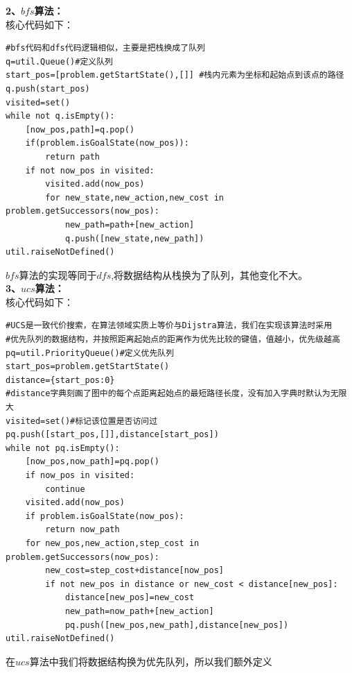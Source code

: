 \documentclass[a4paper,12pt,UTF8]{article}
\begin{document}
\begin{flushleft}
{{    }
    \large{
        \hspace{1cm}\textbf{2、$bfs$算法：\\}
    }
    \normalsize{
        \hspace{1cm}核心代码如下：\\
    }
    \scriptsize{
        \begin{lstlisting}
#bfs代码和dfs代码逻辑相似，主要是把栈换成了队列
q=util.Queue()#定义队列
start_pos=[problem.getStartState(),[]] #栈内元素为坐标和起始点到该点的路径
q.push(start_pos)
visited=set()
while not q.isEmpty():
    [now_pos,path]=q.pop()
    if(problem.isGoalState(now_pos)):
        return path
    if not now_pos in visited:
        visited.add(now_pos)
        for new_state,new_action,new_cost in problem.getSuccessors(now_pos):
            new_path=path+[new_action]
            q.push([new_state,new_path])
util.raiseNotDefined()
        \end{lstlisting}
    }
    \normalsize{
        \hspace{1cm}$bfs$算法的实现等同于$dfs$,将数据结构从栈换为了队列，其他变化不大。\\
    }
    \large{
        \hspace{1cm}\textbf{3、$ucs$算法：\\}
    }
    \normalsize{
        \hspace{1cm}核心代码如下：\\
    }
    \scriptsize{
        \begin{lstlisting}
#UCS是一致代价搜索，在算法领域实质上等价与Dijstra算法，我们在实现该算法时采用
#优先队列的数据结构，并按照距离起始点的距离作为优先比较的键值，值越小，优先级越高
pq=util.PriorityQueue()#定义优先队列
start_pos=problem.getStartState()
distance={start_pos:0}
#distance字典刻画了图中的每个点距离起始点的最短路径长度，没有加入字典时默认为无限大
visited=set()#标记该位置是否访问过
pq.push([start_pos,[]],distance[start_pos])
while not pq.isEmpty():
    [now_pos,now_path]=pq.pop()
    if now_pos in visited:
        continue
    visited.add(now_pos)
    if problem.isGoalState(now_pos):
        return now_path
    for new_pos,new_action,step_cost in problem.getSuccessors(now_pos):
        new_cost=step_cost+distance[now_pos]
        if not new_pos in distance or new_cost < distance[new_pos]:
            distance[new_pos]=new_cost
            new_path=now_path+[new_action]
            pq.push([new_pos,new_path],distance[new_pos])
util.raiseNotDefined()
        \end{lstlisting}
    }
    \normalsize{
        \hspace{1cm}在$ucs$算法中我们将数据结构换为优先队列，所以我们额外定义
}}
\end{flushleft}
\end{document}
